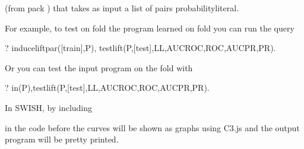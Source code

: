 \documentclass[letterpaper,10pt,english]{sphinxmanual}
\begin{document}
\begin{sphinxVerbatim}[commandchars=\\\{\}]
  
\end{sphinxVerbatim}

\sphinxAtStartPar
(from pack ) that takes as input a list  of pairs probability\sphinxhyphen{}literal.

\sphinxAtStartPar
For example, to test on fold  the program learned on fold  you can run the query

\begin{sphinxVerbatim}[commandchars=\\\{\}]
?\PYGZhy{} induce\PYGZus{}lift\PYGZus{}par([train],P),
test\PYGZus{}lift(P,[test],LL,AUCROC,ROC,AUCPR,PR).
\end{sphinxVerbatim}

\sphinxAtStartPar
Or you can test the input program on the fold  with

\begin{sphinxVerbatim}[commandchars=\\\{\}]
?\PYGZhy{} in(P),test\PYGZus{}lift(P,[test],LL,AUCROC,ROC,AUCPR,PR).
\end{sphinxVerbatim}

\sphinxAtStartPar
In SWISH, by including

\begin{sphinxVerbatim}[commandchars=\\\{\}]
 
 
\end{sphinxVerbatim}

\sphinxAtStartPar
in the code before  the curves will be shown as graphs using C3.js and the output program will be pretty printed.
\end{document}
